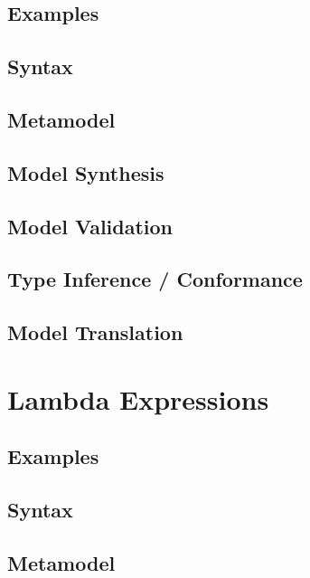 \documentclass[a4paper,oneside,12pt, extrafontsizes]{memoir}
\begin{document}
    \section{Examples}
    

    \section{Syntax}

    \section{Metamodel}

    \section{Model Synthesis}

    \section{Model Validation}

    \section{Type Inference / Conformance}

    \section{Model Translation}

  \chapter{Lambda Expressions}
  \label{ch:lambdas}
  

    \section{Examples}
    

    \section{Syntax}

    \section{Metamodel}
\end{document}
